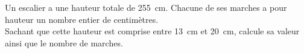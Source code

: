 
Un escalier a une hauteur totale de 255~cm. Chacune de ses marches a pour hauteur un nombre entier de centimètres.\\Sachant que cette hauteur est comprise entre 13~cm et 20~cm, calcule sa valeur ainsi que le nombre de marches.

